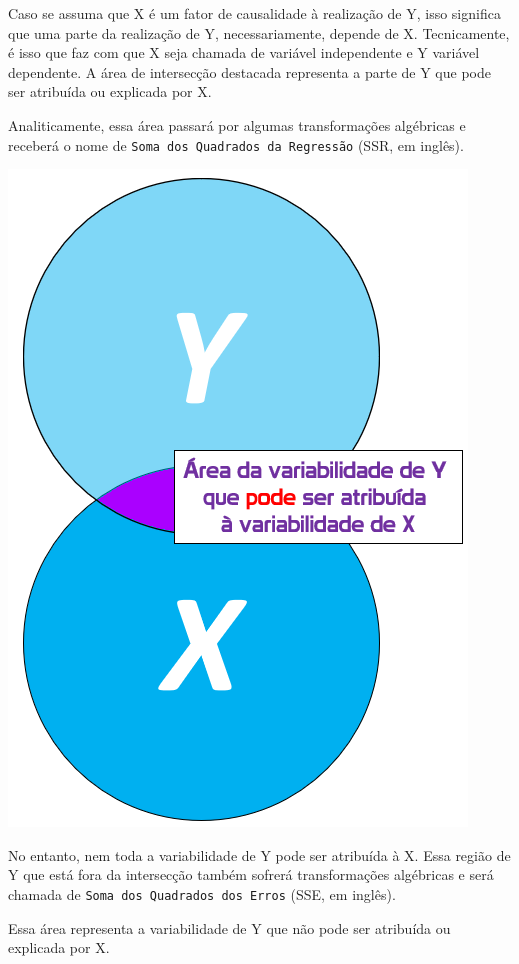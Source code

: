 \documentclass[
]{book}
\begin{document}
Caso se assuma que X é um fator de causalidade à realização de Y, isso
significa que uma parte da realização de Y, necessariamente, depende de
X. Tecnicamente, é isso que faz com que X seja chamada de variável
independente e Y variável dependente. A área de intersecção destacada
representa a parte de Y que pode ser atribuída ou explicada por X.

Analiticamente, essa área passará por algumas transformações algébricas
e receberá o nome de \texttt{Soma\ dos\ Quadrados\ da\ Regressão} (SSR,
em inglês).

\includegraphics{./img/cap_reg_xy_SSR.png}

No entanto, nem toda a variabilidade de Y pode ser atribuída à X. Essa
região de Y que está fora da intersecção também sofrerá transformações
algébricas e será chamada de \texttt{Soma\ dos\ Quadrados\ dos\ Erros}
(SSE, em inglês).

Essa área representa a variabilidade de Y que não pode ser atribuída ou
explicada por X.
\end{document}

